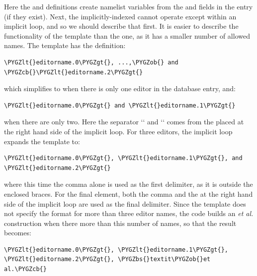 \documentclass[letterpaper,10pt,english]{sphinxmanual}
\def\PYGZbs{\char`\\}
\def\PYGZob{\char`\{}
\def\PYGZcb{\char`\}}
\def\PYGZlt{\char`\<}
\def\PYGZgt{\char`\>}
\begin{document}
Here the  and  definitions create namelist variables from the  and  fields in the entry (if they exist). Next, the implicitly-indexed  cannot operate except within an implicit loop, and so we should describe that first. It is easier to describe the functionality of the  template than the  one, as it has a smaller number of allowed names. The  template has the definition:

\begin{Verbatim}[commandchars=\\\{\}]
\PYGZlt{}editorname.0\PYGZgt{}, ...,\PYGZob{} and \PYGZcb{}\PYGZlt{}editorname.2\PYGZgt{}
\end{Verbatim}

which simplifies to  when there is only one editor in the database entry, and:

\begin{Verbatim}[commandchars=\\\{\}]
\PYGZlt{}editorname.0\PYGZgt{} and \PYGZlt{}editorname.1\PYGZgt{}
\end{Verbatim}

when there are only two. Here the separator {}`{}` and {}`{}` comes from the  placed at the right hand side of the implicit loop. For three editors, the implicit loop expands the template to:

\begin{Verbatim}[commandchars=\\\{\}]
\PYGZlt{}editorname.0\PYGZgt{}, \PYGZlt{}editorname.1\PYGZgt{}, and \PYGZlt{}editorname.2\PYGZgt{}
\end{Verbatim}

where this time the comma alone is used as the first delimiter, as it is outside the enclosed braces. For the final element, both the comma and the  at the right hand side of the implicit loop are used as the final delimiter. Since the template does not specify the format for more than three editor names, the code builds an \emph{et al.} construction when there more than this number of names, so that the result becomes:

\begin{Verbatim}[commandchars=\\\{\}]
\PYGZlt{}editorname.0\PYGZgt{}, \PYGZlt{}editorname.1\PYGZgt{}, \PYGZlt{}editorname.2\PYGZgt{}, \PYGZbs{}textit\PYGZob{}et al.\PYGZcb{}
\end{Verbatim}
\end{document}
